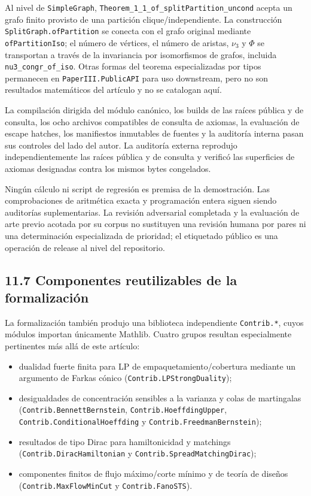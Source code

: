 \documentclass[
  spanish,
  11pt,
  a4paper,
]{article}
\providecommand{\tightlist}{%
  \setlength{\itemsep}{0pt}\setlength{\parskip}{0pt}}
\begin{document}
Al nivel de \texttt{SimpleGraph}, \texttt{Theorem\_1\_1\_of\_splitPartition\_uncond} acepta un grafo finito provisto de una partición clique/independiente. La construcción \texttt{SplitGraph.ofPartition} se conecta con el grafo original mediante \texttt{ofPartitionIso}; el número de vértices, el número de aristas, \(\nu_3\) y \(\Phi\) se transportan a través de la invariancia por isomorfismos de grafos, incluida \texttt{nu3\_congr\_of\_iso}. Otras formas del teorema especializadas por tipos permanecen en \texttt{PaperIII.PublicAPI} para uso downstream, pero no son resultados matemáticos del artículo y no se catalogan aquí.

La compilación dirigida del módulo canónico, los builds de las raíces pública y de consulta, los ocho archivos compatibles de consulta de axiomas, la evaluación de escape hatches, los manifiestos inmutables de fuentes y la auditoría interna pasan sus controles del lado del autor. La auditoría externa reprodujo independientemente las raíces pública y de consulta y verificó las superficies de axiomas designadas contra los mismos bytes congelados.

Ningún cálculo ni script de regresión es premisa de la demostración. Las comprobaciones de aritmética exacta y programación entera siguen siendo auditorías suplementarias. La revisión adversarial completada y la evaluación de arte previo acotada por su corpus no sustituyen una revisión humana por pares ni una determinación especializada de prioridad; el etiquetado público es una operación de release al nivel del repositorio.

\subsection{11.7 Componentes reutilizables de la formalización}\label{componentes-reutilizables-de-la-formalizaciuxf3n}

La formalización también produjo una biblioteca independiente \texttt{Contrib.*}, cuyos módulos importan únicamente Mathlib. Cuatro grupos resultan especialmente pertinentes más allá de este artículo:

\begin{itemize}
\tightlist
\item
  dualidad fuerte finita para LP de empaquetamiento/cobertura mediante un argumento de Farkas cónico (\texttt{Contrib.LPStrongDuality});
\item
  desigualdades de concentración sensibles a la varianza y colas de martingalas (\texttt{Contrib.BennettBernstein}, \texttt{Contrib.HoeffdingUpper}, \texttt{Contrib.ConditionalHoeffding} y \texttt{Contrib.FreedmanBernstein});
\item
  resultados de tipo Dirac para hamiltonicidad y matchings (\texttt{Contrib.DiracHamiltonian} y \texttt{Contrib.SpreadMatchingDirac});
\item
  componentes finitos de flujo máximo/corte mínimo y de teoría de diseños (\texttt{Contrib.MaxFlowMinCut} y \texttt{Contrib.FanoSTS}).
\end{itemize}
\end{document}
